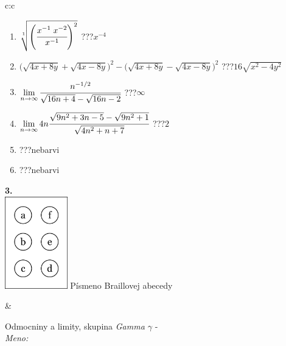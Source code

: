 \documentclass[10pt]{report}
\begin{document}
\begin{tabular}{c:c}
\begin{minipage}[c][104.5mm][t]{0.5\linewidth}
\begin{center}
\begin{minipage}{0.79\linewidth}
\begin{center}
\begin{varwidth}{\linewidth}
\begin{enumerate}
\small
\item $\sqrt[1]{\left(\cfrac{x^{-1}\;x^{-2}}{x^{-1}}\right)^{2}}$\quad \dotfill\; ???\;\dotfill \quad $x^{-4}$
\item {\footnotesize{\scriptsize$\big(\sqrt{4x+8y}+\sqrt{4x-8y}\big)^2-\big(\sqrt{4x+8y}-\sqrt{4x-8y}\big)^2$}\quad \dotfill\; ???\;\dotfill \quad $16\sqrt{x^2-4y^2}$}
\item $\lim\limits_{n\to\infty}\cfrac{n^{-1/2}}{\sqrt{16n+4}-\sqrt{16n-2}}$\quad \dotfill\; ???\;\dotfill \quad $\infty$
\item $\lim\limits_{n\to\infty}4n\cfrac{\sqrt{9n^2+3n-5}-\sqrt{9n^2+1}}{\sqrt{4n^2+n+7}}$\quad \dotfill\; ???\;\dotfill \quad $2$
\item \quad \dotfill\; ???\;\dotfill \quad nebarvi
\item \quad \dotfill\; ???\;\dotfill \quad nebarvi
\end{enumerate}
\end{varwidth}
\end{center}
\end{minipage}
\begin{minipage}{0.20\linewidth}
\begin{center}
{\Huge\bfseries 3.} \\[2mm]
\includegraphics[height=40mm]{../images/braille.png}
{\small Písmeno Braillovej abecedy}
\end{center}
\end{minipage}
\end{center}
\end{minipage}
&
\begin{minipage}[c][104.5mm][t]{0.5\linewidth}
\begin{center}
\vspace{7mm}
{\huge Odmocniny a limity, skupina \textit{Gamma $\gamma$} -}\\[5mm]
\textit{Meno:}\phantom{xxxxxxxxxxxxxxxxxxxxxxxxxxxxxxxxxxxxxxxxxxxxxxxxxxxxxxxxxxxxxxxxx}\\[5mm]

\end{center}
\end{minipage}
\end{tabular}
\end{document}
